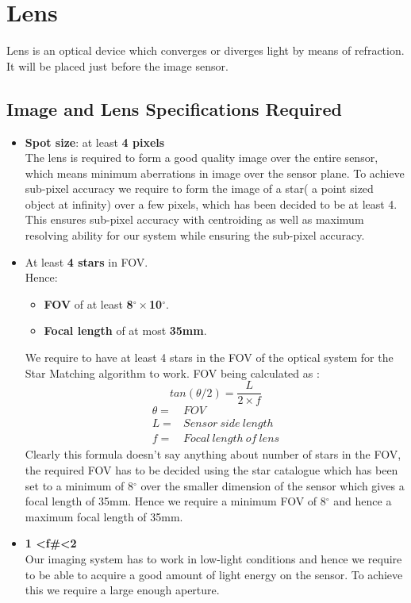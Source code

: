 \section{Lens}
Lens is an optical device which converges or diverges light by means of refraction. It will be placed just before the image sensor.

\subsection{Image and Lens Specifications Required}
\begin{itemize}
    \item \textbf{Spot size}: at least \textbf{4 pixels}
\\The lens is required to form a good quality image over the entire sensor, which means minimum aberrations in image over the sensor plane. To achieve sub-pixel accuracy we require to form the image of a star( a point sized object at infinity) over a few pixels, which has been decided to be at least 4. This ensures sub-pixel accuracy with centroiding as well as maximum resolving ability for our system while ensuring the sub-pixel accuracy.
 \item At least \textbf{4 stars} in FOV.\\Hence:
          \begin{itemize}
              \item \textbf{FOV} of at least \textbf{8$^{\circ}\times$10$^{\circ}$}.
              \item \textbf{Focal length} of at most \textbf{35mm}. 
          \end{itemize} 
We require to have at least 4 stars in the FOV of the optical system for the Star Matching algorithm to work. FOV being calculated as :
\begin{equation}
    tan(\theta/2)=\frac{L}{2\times f}
\end{equation}
\begin{align*}
    \theta=& FOV
    \\L=& Sensor\:side\:length
    \\f=& Focal\:length\:of\:lens 
\end{align*}
Clearly this formula doesn't say anything about number of stars in the FOV, the required FOV has to be decided using the star catalogue which has been set to a minimum of 8$^{\circ}$ over the smaller dimension of the sensor which gives a focal length of 35mm. Hence we require a minimum FOV of 8$^{\circ}$ and hence a maximum focal length of 35mm.
    \item \textbf{1 \textless f\#\textless 2}
\\Our imaging system has to work in low-light conditions and hence we require to be able to acquire a good amount of light energy on the sensor. To achieve this we require a large enough aperture.


\end{itemize}
